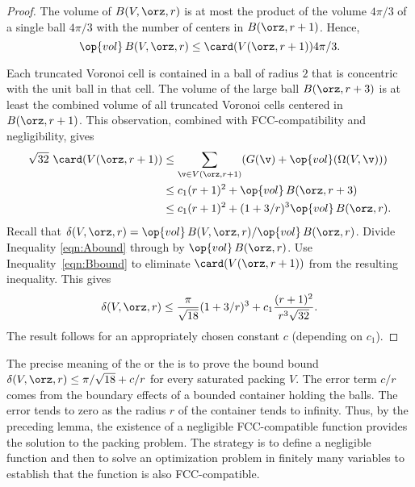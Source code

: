 \begin{proof} 
The volume of $B( V,\orz,r)$ is at most the product of the volume
$4\pi/3$ of a single ball $4\pi/3$ with the number of centers in
$B(\orz,r+1)$.  Hence,
\begin{equation} 
\op{vol}\, B( V,\orz,r) \le \card( V(\orz,r+1)) 4\pi/3.
\label{eqn:Abound}
\end{equation}

Each truncated Voronoi cell is contained in a ball of radius $2$ that
is concentric with the unit ball in that cell.  The volume of the
large ball $B(\orz,r+3)$ is at least the combined volume of all
truncated Voronoi cells centered in $B(\orz,r+1)$. This observation,
combined with FCC-compatibility and negligibility, gives
\begin{equation} 
\begin{split} 
\sqrt{32}\,\,\card( V(\orz,r+1))
&\le \sum_{\v\in V(\orz,r+1)} (G(\v) +
\op{vol}(\Omega(V,\v))) \\
&\le c_1 (r+1)^2 + \op{vol}\,B(\orz,r+3) \\
&\le c_1 (r+1)^2 + (1+3/r)^3 \op{vol}\,B(\orz,r).
\label{eqn:Bbound}
\end{split}
\end{equation}
%
Recall that $\delta( V,\orz,r)=
\op{vol}\,B( V,\orz,r)/\op{vol}\,B(\orz,r)$. Divide Inequality
\ref{eqn:Abound} through by $\op{vol}\,B(\orz,r)$.  Use
Inequality~\ref{eqn:Bbound} to eliminate $\card( V(\orz,r+1))$ from the
resulting inequality.  This gives
\[ \delta( V,\orz,r)
\le \frac{\pi}{\sqrt{18}} (1+3/r)^3 + c_1 \frac{(r+1)^2}{r^3\sqrt{32}}.
\] 
The result follows for an appropriately chosen constant $c$
(depending on $c_1$).
\end{proof}

\begin{remark}
\label{remark:precise} 
The precise meaning of the  or the
 is to prove the bound bound $\delta(
V,\orz,r) \le \pi/\sqrt{18} + c/r$ for every saturated packing $ V$.
The error term $c/r$ comes from the boundary effects of a bounded
container holding the balls.  The error tends to zero as the radius
$r$ of the container tends to infinity.  Thus, by the preceding lemma,
the existence of a negligible FCC-compatible function provides the
solution to the packing problem.  The strategy is to define a
negligible function and then to solve an optimization problem in
finitely many variables to establish that the function is also
FCC-compatible.
\end{remark}





